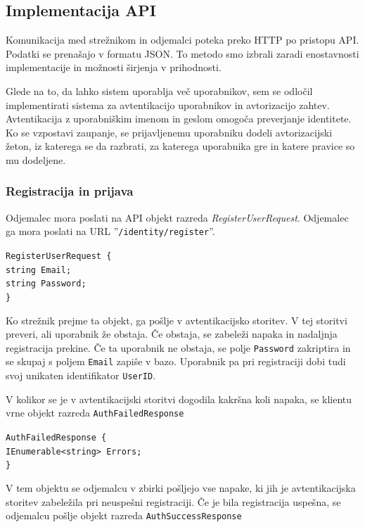\documentclass[a4paper, 12pt]{book}
\begin{document}
\subsection{Implementacija API}

Komunikacija med strežnikom in odjemalci poteka preko HTTP po pristopu API.
Podatki se prenašajo v formatu JSON.
To metodo smo izbrali zaradi enostavnosti implementacije in možnosti širjenja v prihodnosti.

Glede na to, da lahko sistem uporablja več uporabnikov, sem se odločil implementirati sistema za avtentikacijo uporabnikov in avtorizacijo zahtev.
Avtentikacija z uporabniškim imenom in geslom omogoča preverjanje identitete.
Ko se vzpostavi zaupanje, se prijavljenemu uporabniku dodeli avtorizacijski žeton, iz katerega se da razbrati, za katerega uporabnika gre in katere pravice so mu dodeljene.

\subsubsection{Registracija in prijava}

Odjemalec mora poslati na API objekt razreda \textit{RegisterUserRequest}.
Odjemalec ga mora poslati na URL ''\texttt{/identity/register}''.

\noindent \texttt{RegisterUserRequest \{ \\
	string Email; \\
	string Password; \\
\} }

Ko strežnik prejme ta objekt, ga pošlje v avtentikacijsko storitev.
V tej storitvi preveri, ali uporabnik že obstaja.
Če obstaja, se zabeleži napaka in nadaljnja registracija prekine.
Če ta uporabnik ne obstaja, se polje \texttt{Password} zakriptira in se skupaj s poljem \texttt{Email} zapiše v bazo.
Uporabnik pa pri registraciji dobi tudi svoj unikaten identifikator \texttt{UserID}.

V kolikor se je v avtentikacijski storitvi dogodila kakršna koli napaka, se klientu vrne objekt razreda \texttt{AuthFailedResponse}

\noindent \texttt{AuthFailedResponse \{ \\
  IEnumerable<string> Errors; \\
\} }

\noindent V tem objektu se odjemalcu v zbirki pošljejo vse napake, ki jih je avtentikacijska storitev zabeležila pri neuspešni registraciji.  Če je bila registracija uspešna, se odjemalcu pošlje objekt razreda \texttt{AuthSuccessResponse}
\end{document}
